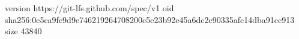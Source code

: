 version https://git-lfs.github.com/spec/v1
oid sha256:0c5ca9fe9d9e746219264708200c5e23b92e45a6dc2c90335afc14dba91cc913
size 43840
